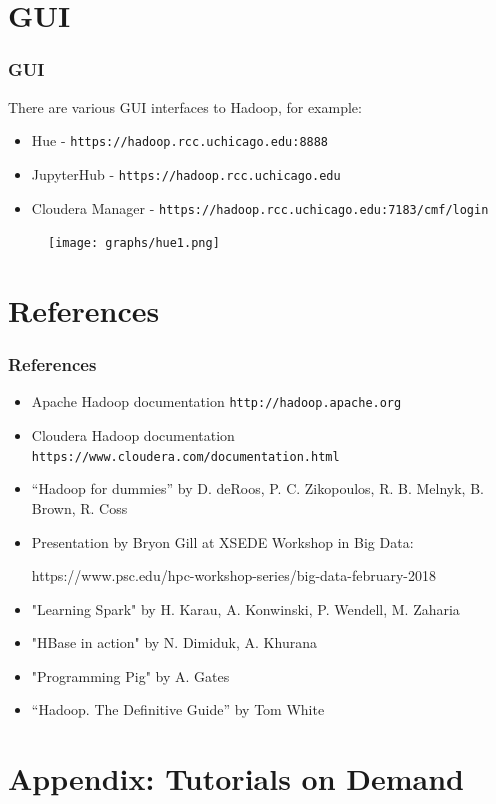 \documentclass{beamer}
\begin{document}
\section{GUI}
\begin{frame}[fragile]
  \frametitle{GUI}
  There are various GUI interfaces to Hadoop, for example:
  \begin{itemize}
    \item Hue - {\color{mycolorcli}\verb|https://hadoop.rcc.uchicago.edu:8888|}
    \item JupyterHub - {\color{mycolorcli}\verb|https://hadoop.rcc.uchicago.edu|}
    \item Cloudera Manager - {\color{mycolorcli}\verb|https://hadoop.rcc.uchicago.edu:7183/cmf/login|}
  \end{itemize}
 \begin{figure}[h]
 \texttt{[image: graphs/hue1.png]}
 \end{figure}

\end{frame}


\section{References}
\begin{frame}[fragile]
 \frametitle{References}
 \begin{itemize}
 \item Apache Hadoop documentation {\color{mycolorcli}\verb|http://hadoop.apache.org|}
 \item Cloudera Hadoop documentation {\color{mycolorcli}\verb|https://www.cloudera.com/documentation.html|}
  \item ``Hadoop for dummies'' by D. deRoos, P. C. Zikopoulos, R. B. Melnyk, B. Brown, R. Coss
  \item Presentation by Bryon Gill at XSEDE Workshop in Big Data: 
{\color{mycolorcli}
  \begin{verbnobox}[\small]
https://www.psc.edu/hpc-workshop-series/big-data-february-2018
  \end{verbnobox}
}
  \item "Learning Spark" by H. Karau, A. Konwinski, P. Wendell, M. Zaharia
  \item "HBase in action" by N. Dimiduk, A. Khurana
  \item "Programming Pig" by A. Gates
  \item ``Hadoop. The Definitive Guide'' by Tom White
 \end{itemize}

\end{frame}

\section{Appendix: Tutorials on Demand}

\end{document}
